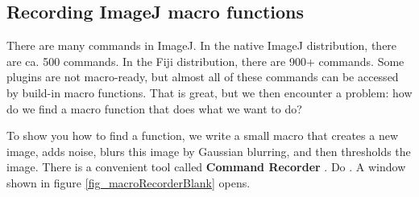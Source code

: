 

\subsection{Recording ImageJ macro functions}
There are many commands in ImageJ. In the native ImageJ distribution, there are ca. 500 commands. In the Fiji distribution, there are 900+ commands. Some plugins are not macro-ready, but almost all of these commands can be accessed by build-in macro functions. That is great, but we then encounter a problem: how do we find a macro function that does what we want to do?

To show you how to find a function, we write a small macro that creates a new image, adds noise, blurs this image by Gaussian blurring, and then thresholds the image. There is a convenient tool called \textbf{Command Recorder} . 
Do . A window shown in figure
\ref{fig_macroRecorderBlank} opens.
